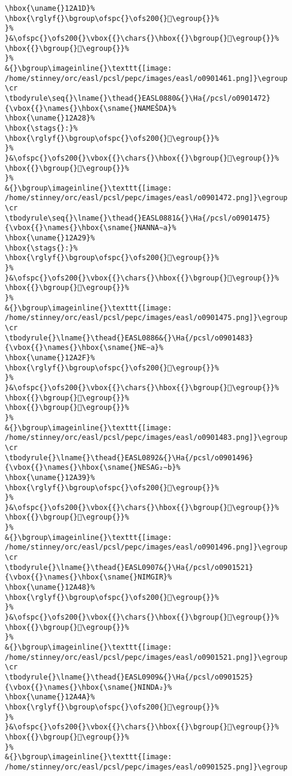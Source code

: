 \begin{verbatim}
\hbox{\uname{}12A1D}%
\hbox{\rglyf{}\bgroup\ofspc{}\ofs200{}𒨝\egroup{}}%
}%
}&\ofspc{}\ofs200{}\vbox{{}\chars{}\hbox{{}\bgroup{}𒨝\egroup{}}%
\hbox{{}\bgroup{}𒨞\egroup{}}%
}%
&{}\bgroup\imageinline{}\texttt{[image: /home/stinney/orc/easl/pcsl/pepc/images/easl/o0901461.png]}\egroup
\cr
\tbodyrule\seq{}\lname{}\thead{}EASL0880&{}\Ha{/pcsl/o0901472}{\vbox{{}\names{}\hbox{\sname{}NAMEŠDA}%
\hbox{\uname{}12A28}%
\hbox{\stags{}:}%
\hbox{\rglyf{}\bgroup\ofspc{}\ofs200{}𒨨\egroup{}}%
}%
}&\ofspc{}\ofs200{}\vbox{{}\chars{}\hbox{{}\bgroup{}𒨧\egroup{}}%
\hbox{{}\bgroup{}𒨨\egroup{}}%
}%
&{}\bgroup\imageinline{}\texttt{[image: /home/stinney/orc/easl/pcsl/pepc/images/easl/o0901472.png]}\egroup
\cr
\tbodyrule\seq{}\lname{}\thead{}EASL0881&{}\Ha{/pcsl/o0901475}{\vbox{{}\names{}\hbox{\sname{}NANNA∼a}%
\hbox{\uname{}12A29}%
\hbox{\stags{}:}%
\hbox{\rglyf{}\bgroup\ofspc{}\ofs200{}𒨩\egroup{}}%
}%
}&\ofspc{}\ofs200{}\vbox{{}\chars{}\hbox{{}\bgroup{}𒨩\egroup{}}%
\hbox{{}\bgroup{}𒨪\egroup{}}%
}%
&{}\bgroup\imageinline{}\texttt{[image: /home/stinney/orc/easl/pcsl/pepc/images/easl/o0901475.png]}\egroup
\cr
\tbodyrule{}\lname{}\thead{}EASL0886&{}\Ha{/pcsl/o0901483}{\vbox{{}\names{}\hbox{\sname{}NE∼a}%
\hbox{\uname{}12A2F}%
\hbox{\rglyf{}\bgroup\ofspc{}\ofs200{}𒨯\egroup{}}%
}%
}&\ofspc{}\ofs200{}\vbox{{}\chars{}\hbox{{}\bgroup{}𒨯\egroup{}}%
\hbox{{}\bgroup{}𒨰\egroup{}}%
\hbox{{}\bgroup{}𒨱\egroup{}}%
}%
&{}\bgroup\imageinline{}\texttt{[image: /home/stinney/orc/easl/pcsl/pepc/images/easl/o0901483.png]}\egroup
\cr
\tbodyrule{}\lname{}\thead{}EASL0892&{}\Ha{/pcsl/o0901496}{\vbox{{}\names{}\hbox{\sname{}NESAG₂∼b}%
\hbox{\uname{}12A39}%
\hbox{\rglyf{}\bgroup\ofspc{}\ofs200{}𒨹\egroup{}}%
}%
}&\ofspc{}\ofs200{}\vbox{{}\chars{}\hbox{{}\bgroup{}𒨷\egroup{}}%
\hbox{{}\bgroup{}𒨹\egroup{}}%
}%
&{}\bgroup\imageinline{}\texttt{[image: /home/stinney/orc/easl/pcsl/pepc/images/easl/o0901496.png]}\egroup
\cr
\tbodyrule{}\lname{}\thead{}EASL0907&{}\Ha{/pcsl/o0901521}{\vbox{{}\names{}\hbox{\sname{}NIMGIR}%
\hbox{\uname{}12A48}%
\hbox{\rglyf{}\bgroup\ofspc{}\ofs200{}𒩈\egroup{}}%
}%
}&\ofspc{}\ofs200{}\vbox{{}\chars{}\hbox{{}\bgroup{}𒩇\egroup{}}%
\hbox{{}\bgroup{}𒩈\egroup{}}%
}%
&{}\bgroup\imageinline{}\texttt{[image: /home/stinney/orc/easl/pcsl/pepc/images/easl/o0901521.png]}\egroup
\cr
\tbodyrule{}\lname{}\thead{}EASL0909&{}\Ha{/pcsl/o0901525}{\vbox{{}\names{}\hbox{\sname{}NINDA₂}%
\hbox{\uname{}12A4A}%
\hbox{\rglyf{}\bgroup\ofspc{}\ofs200{}𒩊\egroup{}}%
}%
}&\ofspc{}\ofs200{}\vbox{{}\chars{}\hbox{{}\bgroup{}𒩧\egroup{}}%
\hbox{{}\bgroup{}𒩊\egroup{}}%
}%
&{}\bgroup\imageinline{}\texttt{[image: /home/stinney/orc/easl/pcsl/pepc/images/easl/o0901525.png]}\egroup

\end{verbatim}
